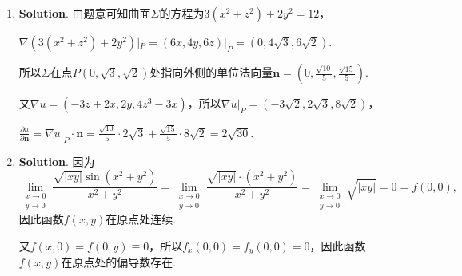 \documentclass[../main.tex]{subfiles}
\begin{document}
\begin{enumerate}
          则曲面$xy+z=0$在点$P_{0}(2,1,-2)$处切平面的法向量可以取为$\nabla F|_{P_0}= (
              1,2,1)$，

          切平面为$1\cdot(x-2)+2\cdot(y-1)+1\cdot(z+2)=0$，即$x+2y+z=2$.

          设经过直线$L$的平面束方程为$x+y+z-1+\lambda(2x+y+4z-2)=0$，

          即$(2\lambda+1)x + (\lambda+1)y + (4\lambda+1)z - (2\lambda+1)=0$，

          令其与切平面垂直，即$(2\lambda+1, \lambda+1, 4\lambda+1) \cdot (1,2,1) = 8\lambda
              + 4 = 0$，解得$\lambda = -\frac{1}{2}$，

          所以切平面上的投影直线的方程为$\begin{cases}
                  x+2y+z=2, \\
                  y-2z=0.
              \end{cases}$

    \item \textbf{Solution}. 由题意可知曲面$\Sigma$的方程为$3(x^{2}+z^{2})+2
              y^{2}=12$，

          $\nabla \left(3(x^{2}+z^{2})+2y^{2}\right)|_{P}= (6x, 4y, 6z)|_{P}= (0,4\sqrt{3}
              ,6\sqrt{2})$.

          所以$\Sigma$在点$P\left(0,\sqrt{3},\sqrt{2}\right)$处指向外侧的单位法向量$\boldsymbol
              {n}=\left(0,\frac{\sqrt{10}}{5},\frac{\sqrt{15}}{5}\right)$.

          又$\nabla u = (-3z+2x, 2y, 4z^{3}-3x)$，所以$\nabla u|_{P}= \left(-3\sqrt{2}
              , 2\sqrt{3}, 8\sqrt{2}\right)$，

          $\frac{\partial u}{\partial \boldsymbol{n}}= \nabla u|_{P}\cdot \boldsymbol
              {n}= \frac{\sqrt{10}}{5}\cdot 2\sqrt{3}+ \frac{\sqrt{15}}{5}\cdot 8\sqrt{2}
              = 2\sqrt{30}$.

    \item \textbf{Solution}. 因为
          \[
              \lim_{\substack{x\to 0 \\ y\to 0}}\frac{\sqrt{|xy|}\sin\left(x^{2}+y^{2}\right)}{x^{2}+y^{2}}
              =\lim_{\substack{x\to 0 \\ y\to 0}}\frac{\sqrt{|xy|}\cdot\left(x^{2}+y^{2}\right)}{x^{2}+y^{2}}
              = \lim_{\substack{x\to 0 \\ y\to 0}}\sqrt{|xy|}=0=f(0,0),
          \]
          因此函数$f(x,y)$在原点处连续.

          又$f(x,0)=f(0,y)\equiv 0$，所以$f_{x}(0,0)=f_{y}(0,0)=0$，因此函数$f(x,y)$在原点处的偏导数存在.


\end{enumerate}
\end{document}
